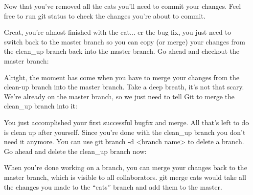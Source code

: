 \bigskip
\nl {}
\nl Now that you've removed all the cats you'll need to commit your changes. Feel free to run git status to check the changes you're about to commit.
\nl{}

\bigskip
\nl {}
Great, you're almost finished with the cat... er the bug fix, you just need to switch back to the master branch so you can copy (or merge) your changes from the clean\_up branch back into the master branch.
\nl Go ahead and checkout the master branch:
\nl {}

\bigskip
\nl {}
\nl Alright, the moment has come when you have to merge your changes from the clean-up branch into the master branch. Take a deep breath, it's not that scary.
\nl We're already on the master branch, so we just need to tell Git to merge the clean\_up branch into it:
\nl{}

\bigskip
\nl {}
\nl You just accomplished your first successful bugfix and merge. All that's left to do is clean up after yourself. Since you're done with the clean\_up branch you don't need it anymore.
\nl You can use git branch -d <branch name> to delete a branch. Go ahead and delete the clean\_up branch now:\par
\nl {}

\bigskip
\nl {}
\nl When you’re done working on a branch, you can merge your changes back to the master branch, which is visible to all collaborators. git merge cats would take all the changes you made to the “cats” branch and add them to the master.
\nl{}
